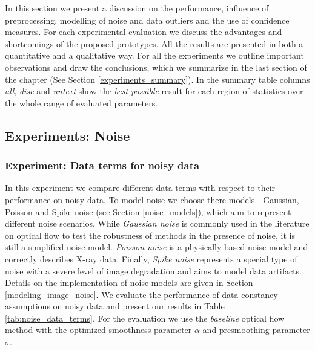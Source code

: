 In this section we present a discussion on the performance, influence of preprocessing, modelling of noise and data outliers and the use of confidence measures. For each experimental evaluation we discuss the advantages and shortcomings of the proposed prototypes. All the results are presented in both a quantitative and a qualitative way. 
For all the experiments we outline important observations and draw the conclusions, which we summarize in the last section of the chapter (See Section \ref{experiments_summary}). In the summary table columns \textit{all}, \textit{disc} and \textit{untext} show the \textit{best possible} result for each region of statistics over the whole range of evaluated parameters.






\subsection{Experiments: Noise}
\label{exp_noise}

\subsubsection{Experiment: Data terms for noisy data}
\label{experiment_data_terms_for_noisy_data}


In this experiment we compare different data terms with respect to their performance on noisy data. To model noise we choose there models - Gaussian, Poisson and Spike noise (see Section \ref{noise_models}), which aim to represent different noise scenarios. While \textit{Gaussian noise} is commonly used in the literature on optical flow to test the robustness of methods in the presence of noise, it is still a simplified noise model. \textit{Poisson noise} is a physically based noise model and correctly describes X-ray data. Finally, \textit{Spike noise} represents a special type of noise with a severe level of image degradation and aims to model data artifacts. Details on the implementation of noise models are given in Section \ref{modeling_image_noise}. We evaluate the performance of data constancy assumptions on noisy data and present our results in Table \ref{tab:noise_data_terms}. For the evaluation we use the \textit{baseline} optical flow method with the optimized  smoothness parameter $\alpha$ and presmoothing parameter $\sigma$. 

